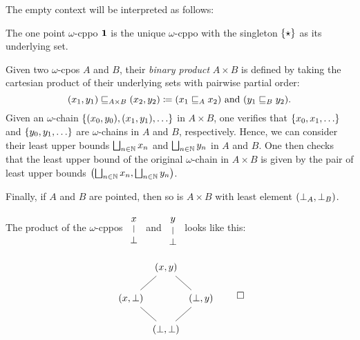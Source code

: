 The empty context will be interpreted as follows:

\begin{example}\label{exam:one-point}
  The one point \(\omega\)-cppo \(\One\) is the unique \(\omega\)-cppo with the
  singleton \(\set{\star}\) as its underlying set.
\end{example}

\begin{definition}
  Given two \(\omega\)-cpos \(A\) and \(B\), their \emph{binary product}
  \(A \times B\) is defined by taking the cartesian product of their underlying
  sets with pairwise partial order:
  \[
    (x_1 , y_1) \below_{A \times B} (x_2 , y_2) %
    \coloneqq (x_1 \below_A x_2) \text{ and } (y_1 \below_B y_2).
  \]
  Given an \(\omega\)-chain \(\set{(x_0,y_0),(x_1,y_1),\dots}\) in
  \(A \times B\), one verifies that \(\set{x_0,x_1,\dots}\) and
  \(\set{y_0,y_1,\dots}\) are \(\omega\)-chains in \(A\) and \(B\),
  respectively.
  Hence, we can consider their least upper bounds \(\bigsqcup_{n \in \Nat}x_n\)
  and \(\bigsqcup_{n \in \Nat}y_n\) in \(A\) and \(B\).
  One then checks that the least upper bound of the original \(\omega\)-chain in
  \(A \times B\) is given by the pair of least upper bounds
  \(\pa*{\bigsqcup_{n \in \Nat}x_n , \bigsqcup_{n \in \Nat}y_n}\).

  Finally, if \(A\) and \(B\) are pointed, then so is \(A \times B\) with least
  element \(\pa*{\bot_A , \bot_B}\).
\end{definition}

\begin{example}
  The product of the \(\omega\)-cppos %
  \(\begin{tikzcd}[row sep=8pt]
    x \\
    \bot \ar[u, no head]
  \end{tikzcd}\)
  and \( \begin{tikzcd}[row sep=8pt]
    y \\
    \bot \ar[u, no head]
  \end{tikzcd}
  \) looks like this:

  \[
    \begin{tikzcd}[row sep=15pt,column sep=1pt]
      & (x,y) \\
      (x,\bot) \ar[ur, no head]& & (\bot,y) \ar[ul, no head] \\
      & (\bot,\bot) \ar[ur,no head] \ar[ul, no head]
    \end{tikzcd}\qedhere
  \]
\end{example}

